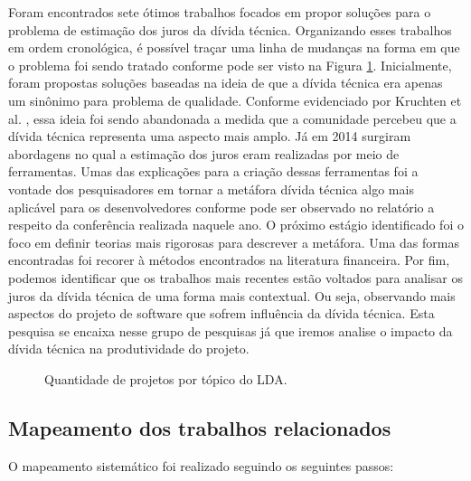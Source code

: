 Foram encontrados sete ótimos trabalhos focados em propor soluções para o problema de estimação dos juros da dívida técnica. Organizando esses trabalhos em ordem cronológica, é possível traçar uma linha de mudanças na forma em que o problema foi sendo tratado conforme pode ser visto na Figura \ref{fig:historico_pesquisas}. Inicialmente, foram propostas soluções baseadas na ideia de que a dívida técnica era apenas um sinônimo para problema de qualidade. Conforme evidenciado por Kruchten et al. \cite{kruchten2013technical}, essa ideia foi sendo abandonada a medida que a comunidade percebeu que a dívida técnica representa uma aspecto mais amplo. Já em 2014 surgiram abordagens no qual a estimação dos juros eram realizadas por meio de ferramentas. Umas das explicações para a criação dessas ferramentas foi a vontade dos pesquisadores em tornar a metáfora dívida técnica algo mais aplicável para os desenvolvedores conforme pode ser observado no relatório a respeito da conferência realizada naquele ano\cite{falessi2014technical}.  O próximo estágio identificado foi o foco em definir teorias mais rigorosas para descrever a metáfora. Uma das formas encontradas foi recorer à métodos encontrados na literatura financeira. Por fim, podemos identificar que os trabalhos mais recentes estão voltados para analisar os juros da dívida técnica de uma forma mais contextual. Ou seja, observando mais aspectos do projeto de software que sofrem influência da dívida técnica. Esta pesquisa se encaixa nesse grupo de pesquisas já que iremos analise o impacto da dívida técnica na produtividade do projeto.


 \begin{figure}[H]
  \centering
  \caption{Quantidade de projetos por tópico do LDA.}
  \label{fig:historico_pesquisas} 
\end{figure}

  
\subsection{Mapeamento dos trabalhos relacionados}  

O mapeamento sistemático foi realizado seguindo os seguintes passos:

